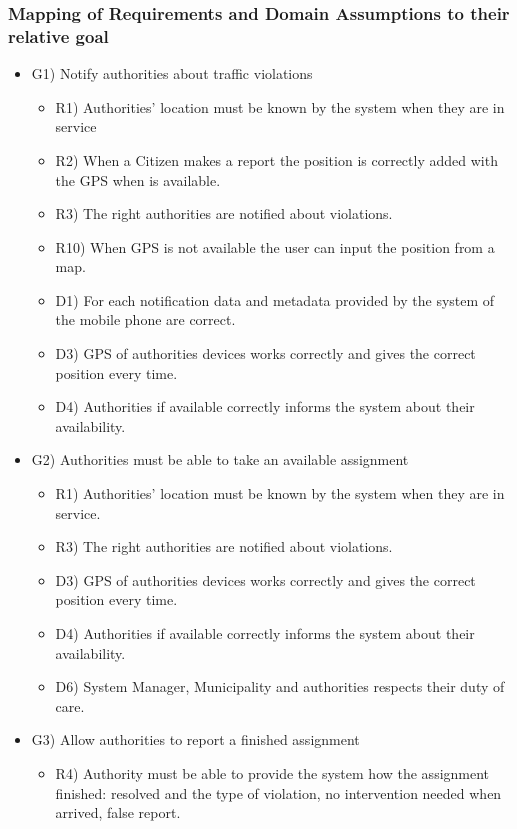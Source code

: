 \subsubsection{Mapping of Requirements and Domain Assumptions to their relative goal}
\begin{itemize}
\item G1) Notify authorities about traffic violations
\begin{itemize}
 \item R1) Authorities’ location must be known by the system when they are in service
 \item R2) When a Citizen makes a report the position is correctly added with the GPS when is available.
 \item R3) The right authorities are notified about violations.
 \item R10) When GPS is not available the user can input the position from a map.
 \item D1) For each notification data and metadata provided by the system of the mobile phone are
correct.
 \item D3) GPS of authorities devices works correctly and gives the correct position every time.
 \item D4) Authorities if available correctly informs the system about their availability.
\end{itemize}
\item G2) Authorities must be able to take an available assignment
\begin{itemize}
 \item R1) Authorities’ location must be known by the system when they are in service.
 \item R3) The right authorities are notified about violations.
 \item D3) GPS of authorities devices works correctly and gives the correct position every time.
 \item D4) Authorities if available correctly informs the system about their availability.
 \item D6) System Manager, Municipality and authorities respects their duty of care.
\end{itemize}
\item G3) Allow authorities to report a finished assignment
\begin{itemize}
 \item R4) Authority must be able to provide the system how the assignment finished: resolved and the
type of violation, no intervention needed when arrived, false report.

\end{itemize}
\end{itemize}
